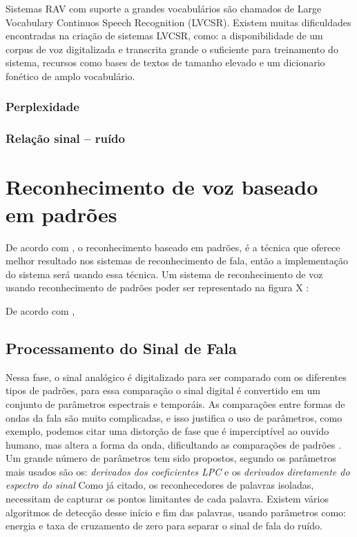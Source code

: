 Sistemas RAV com suporte a grandes vocabulários são chamados de Large Vocabulary Continuos Speech Recognition (LVCSR). Existem muitas dificuldades encontradas na criação de sistemas LVCSR, como: a disponibilidade de um corpus de voz digitalizada e transcrita grande o suficiente para treinamento do sistema, recursos como bases de textos de
tamanho elevado e um dicionario fonético de amplo vocabulário.\cite{RvPatrick}
\subsubsection{Perplexidade} 

\subsubsection{Relação sinal – ruído}

\section{Reconhecimento de voz baseado em padrões}\label{sec:red_neu}
De acordo com \cite{AvaliaTecJose}, o reconhecimento baseado em padrões, é a técnica que oferece melhor resultado nos sistemas de reconhecimento de fala, então a implementação do sistema será usando essa técnica.
Um sistema de reconhecimento de voz usando reconhecimento de padrões poder ser representado na figura X \cite{FundamentRabiner}:
 

De acordo com \cite{AvaliaTecJose}, 





\subsection{Processamento do Sinal de Fala}
Nessa fase, o sinal analógico é digitalizado para ser comparado com os diferentes tipos de padrões, para essa comparação o sinal digital é convertido em um conjunto de parâmetros espectrais e temporáis. As comparações entre formas de ondas da fala são muito complicadas, e isso justifica o uso de parâmetros, como exemplo, podemos citar uma distorção de fase que é imperciptível ao ouvido humano, mas altera a forma da onda, dificultando as comparações de padrões .\cite{AvaliaTecJose}
Um grande número de parâmetros tem sido propostos, segundo \cite{AvaliaTecJose} os parâmetros mais usados são os: \textit{derivados dos coeficientes LPC} e os \textit{derivados diretamente do espectro do sinal}
Como já citado, os reconhecedores de palavras isoladas, necessitam de capturar os pontos limitantes de cada palavra. Existem vários algoritmos de detecção desse início e fim das palavras, usando parâmetros como: energia e taxa de cruzamento de zero para separar o sinal de fala do ruído. \cite{AvaliaTecJose}

